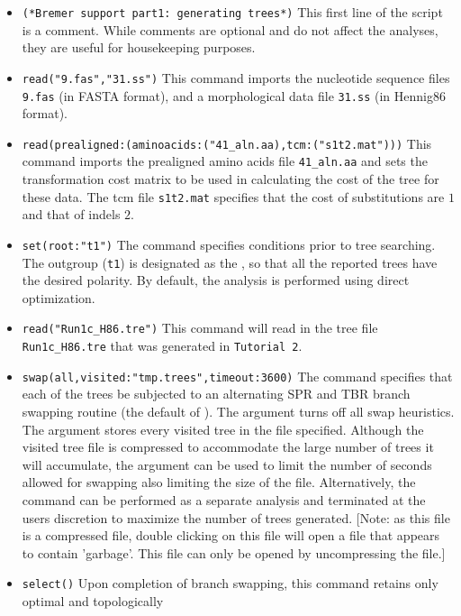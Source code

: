 \begin{itemize}
\item \texttt{(*Bremer support part1: generating trees*)} This first line of the script is a comment. While comments
 are optional and do not affect the analyses, they are useful for housekeeping purposes. 
\item \texttt{read("9.fas","31.ss")} This command imports the nucleotide sequence files \texttt{9.fas} (in FASTA 
format), and a morphological data file \texttt{31.ss} (in Hennig86 format).
\item \texttt{read(prealigned:(aminoacids:("41\_aln.aa),tcm:("s1t2.mat")))} This command imports the prealigned
amino acids file \texttt{41\_aln.aa} and sets the transformation cost matrix to be used in calculating the cost of the tree
for these data.  The tcm file \texttt{s1t2.mat} specifies that the cost of substitutions are $1$ and that of indels $2$.
\item \texttt{set(root:"t1")} The  command specifies 
conditions prior to tree searching. The outgroup (\texttt{t1}) is designated as the , so that all the 
reported trees have the desired polarity. By default, the analysis is performed using direct optimization.
\item \texttt{read("Run1c\_H86.tre")} This command will read in the tree file \texttt{Run1c\_H86.tre} that was 
generated in \texttt{Tutorial 2}.
\item \texttt{swap(all,visited:"tmp.trees",timeout:3600)} The  command specifies that each of 
the trees be subjected to an alternating SPR and TBR branch swapping routine (the default of \poy).  The 
 argument turns off all swap heuristics. The  argument stores 
every visited tree in the file specified.  Although the visited tree file is compressed to accommodate the large 
number of trees it will accumulate, the argument  can be used to limit the number of 
seconds allowed for swapping also limiting the size of the file.  Alternatively,  the   command 
can be performed as a separate analysis and terminated at the users discretion to maximize the number of trees 
generated. [Note: as this  file is a compressed file, double clicking on this file will open 
a file that appears to contain 'garbage'.  This file can only be opened by uncompressing the file.]
\item \texttt{select()} Upon completion of branch swapping, this command retains only optimal and topologically

\end{itemize}
